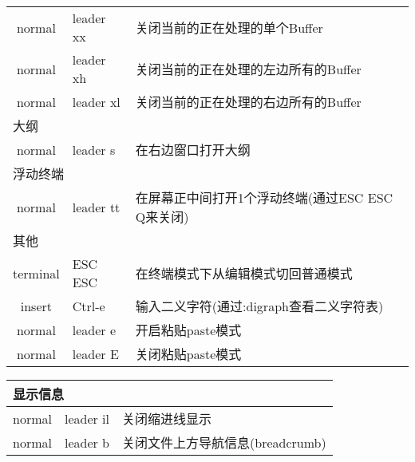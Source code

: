 \documentclass[11pt]{article}
\begin{document}
\begin{left}
\begin{tabular}{|c|l|l|}
    normal & leader xx & 关闭当前的正在处理的单个Buffer \\
    normal & leader xh & 关闭当前的正在处理的左边所有的Buffer \\
    normal & leader xl & 关闭当前的正在处理的右边所有的Buffer \\
    \hline \multicolumn{3}{|l|}{大纲} \\ \hline
    normal & leader s & 在右边窗口打开大纲 \\
    \hline \multicolumn{3}{|l|}{浮动终端} \\ \hline
    normal & leader tt & 在屏幕正中间打开1个浮动终端(通过ESC ESC Q来关闭) \\
    \hline \multicolumn{3}{|l|}{其他} \\ \hline                    
    terminal & ESC ESC & 在终端模式下从编辑模式切回普通模式 \\
    insert & Ctrl-e & 输入二义字符(通过:digraph查看二义字符表) \\
    normal & leader e & 开启粘贴paste模式 \\
    normal & leader E & 关闭粘贴paste模式 \\    
    \hline
  \end{tabular}  
\end{left}
\begin{left}
  \begin{tabular}{|c|l|l|}
    \hline \multicolumn{3}{|l|}{显示信息} \\ \hline                
    normal & leader il & 关闭缩进线显示 \\
    normal & leader b & 关闭文件上方导航信息(breadcrumb) \\
    \hline
  \end{tabular}  
\end{left}

\newpage{}
\end{document}

